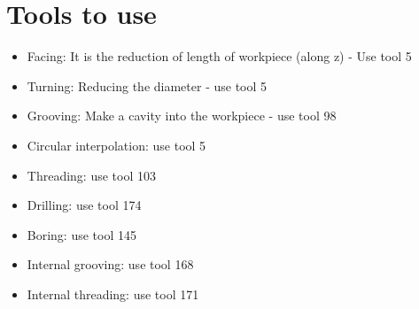 \documentclass{article}
\begin{document}
\section{Tools to use}

\begin{itemize}
	\item Facing: It is the reduction of length of workpiece (along z) - Use tool 5
	\item Turning: Reducing the diameter - use tool 5
	\item Grooving: Make a cavity into the workpiece - use tool 98
	\item Circular interpolation: use tool 5
	\item Threading: use tool 103
	\item Drilling: use tool 174
	\item Boring: use tool 145
	\item Internal grooving: use tool 168
	\item Internal threading: use tool 171

\end{itemize}
\end{document}
